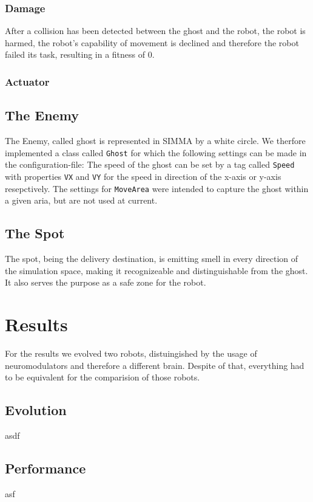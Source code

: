 \documentclass[12pt,fleqn,a4paper]{article}
\begin{document}
\subsubsection{Damage}
After a collision has been detected between the ghost and the robot, the robot is harmed, the robot's capability of movement is declined and therefore the robot failed its task, resulting in a fitness of 0.

\subsubsection{Actuator}


\subsection{The Enemy}

The Enemy, called ghost is represented in SIMMA by a white circle. We therfore implemented a class called \texttt{Ghost} for which the following settings can be made in the configuration-file: The speed of the ghost can be set by a tag called \texttt{Speed} with properties \texttt{VX} and \texttt{VY} for the speed in direction of the x-axis or y-axis resepctively. The settings for \texttt{MoveArea} were intended to capture the ghost within a given aria, but are not used at current.

\subsection{The Spot}
The spot, being the delivery destination, is emitting smell in every direction of the simulation space, making it recognizeable and distinguishable from the ghost. It also serves the purpose as a safe zone for the robot.

\section{Results}
For the results we evolved two robots, distuingished by the usage of neuromodulators and therefore a different brain. Despite of that, everything had to be equivalent for the comparision of those robots.

\subsection{Evolution}
asdf

\subsection{Performance}
asf
\end{document}
